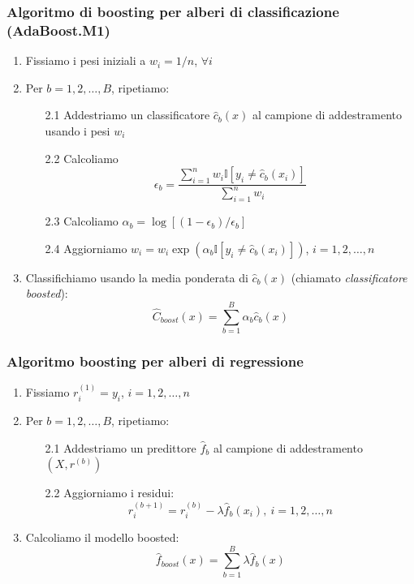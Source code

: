 \begin{frame}
	\frametitle{Algoritmo di boosting per alberi di classificazione (AdaBoost.M1)}
	
	\begin{enumerate}
		\item Fissiamo i pesi iniziali a $w_i = 1/n$, $\forall i$
		\item Per $b=1,2,\ldots,B$, ripetiamo:
			\begin{itemize}
				\item [2.1] Addestriamo un classificatore $\widehat c_b(x)$ al campione di addestramento usando i pesi $w_i$
				\item [2.2] Calcoliamo
				\[
				\epsilon_b = \frac{\sum_{i=1}^n w_i \mathbb{I}[y_i\not= \widehat c_b(x_i)]}{\sum_{i=1}^n w_i}
				\]
				\item [2.3] Calcoliamo $\alpha_b = \log[(1-\epsilon_b)/\epsilon_b]$
				\item [2.4] Aggiorniamo $w_i = w_i \exp(\alpha_b \mathbb{I}[y_i\not= \widehat c_b(x_i)])$, $i=1,2,\ldots,n$
			\end{itemize}
		\item Classifichiamo usando la media ponderata di $\widehat c_b(x)$ (chiamato \emph{classificatore boosted}):
		\[
		\widehat C_{boost}(x) = \sum_{b=1}^B \alpha_b \widehat c_b(x)
		\]
	\end{enumerate}
\end{frame}


\begin{frame}
	\frametitle{Algoritmo boosting per alberi di regressione}
	
	\begin{enumerate}
		\item Fissiamo $r_i^{(1)} = y_i$, $i=1,2,\ldots,n$
		\item Per $b=1,2,\ldots,B$, ripetiamo:
			\begin{itemize}
				\item [2.1] Addestriamo un predittore $\widehat f_b$ al campione di addestramento $(X,r^{(b)})$
				\item [2.2] Aggiorniamo i residui:
				\[
				r_i^{(b+1)} = r_i^{(b)} - \lambda \widehat f_b(x_i),\:i=1,2,\ldots,n
				\]
			\end{itemize}
		\item Calcoliamo il modello boosted:
			\[
			\widehat f_{boost}(x) = \sum_{b=1}^B \lambda \widehat f_b (x)
			\]
	\end{enumerate}
\end{frame}


